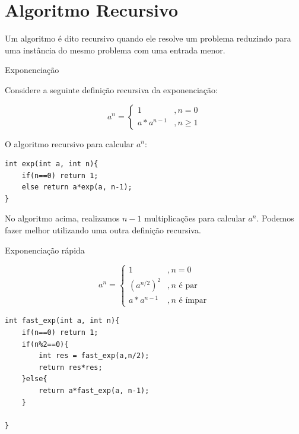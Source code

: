 \section{Algoritmo Recursivo}

Um algoritmo é dito recursivo quando ele resolve um problema reduzindo para uma instância do mesmo problema com uma entrada menor.

\begin{exemplo}{Exponenciação}

Considere a seguinte definição recursiva da exponenciação:

\begin{equation}
a^n = 
\begin{cases}
1           & , n = 0\\
a * a^{n-1} & , n \geq 1
\end{cases}
\end{equation}
\end{exemplo}
O algoritmo recursivo para calcular $a^n$:

\begin{verbatim}
int exp(int a, int n){
	if(n==0) return 1;
	else return a*exp(a, n-1);
}
\end{verbatim}



No algoritmo acima, realizamos $n-1$ multiplicações para calcular $a^n$. Podemos fazer melhor utilizando uma outra definição recursiva.


\begin{exemplo}{Exponenciação rápida}

\begin{equation}
a^n = 
\begin{cases}
1           & , n = 0\\
(a^{n/2})^2 & , \text{$n$ é par}\\
a * a^{n-1} & , \text{$n$ é ímpar}

\end{cases}
\end{equation}
\end{exemplo}
\begin{verbatim}
int fast_exp(int a, int n){
    if(n==0) return 1;
    if(n%2==0){
        int res = fast_exp(a,n/2);
        return res*res;
    }else{
        return a*fast_exp(a, n-1);
    }
    
}
\end{verbatim}




